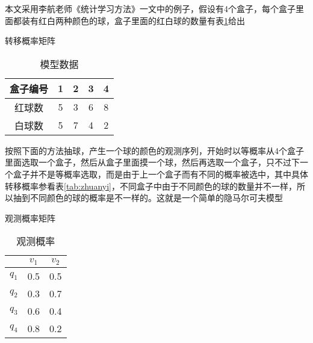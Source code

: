 \documentclass[a4paper,12pt]{ctexart}     %
\begin{document}
	
	本文采用李航老师《统计学习方法》一文中的例子，假设有4个盒子，每个盒子里面都装有红白两种颜色的球，盒子里面的红白球的数量有表\ref{tab:hezi}给出
	
	转移概率矩阵
	
	\begin{table}[htbp]\songti{} 
		\begin{center}
			\renewcommand\arraystretch{2}         %
			\caption{模型数据 \label{tab:hezi}} 
			{  %
				
				\begin{tabular}{|c|c|c|c|c|}\hline   %
					
					\small 盒子编号&1&2&3&4\\\hline   %
					红球数&5&3&6&8\\\hline
					白球数&5&7&4&2\\\hline
				\end{tabular}
			}
		\end{center}
	\end{table}
	
	按照下面的方法抽球，产生一个球的颜色的观测序列，开始时以等概率从4个盒子里面选取一个盒子，然后从盒子里面摸一个球，然后再选取一个盒子，只不过下一个盒子并不是等概率选取，而是由于上一个盒子而有不同的概率被选中，其中具体转移概率参看表\ref{tab:zhuanyi}，不同盒子中由于不同颜色的球的数量并不一样，所以抽到不同颜色的球的概率是不一样的。这就是一个简单的隐马尔可夫模型
	
	
	观测概率矩阵
	
	\begin{table}[htbp]\songti{} 
		
		\begin{center}
			\renewcommand\arraystretch{2}         %
			\caption{观测概率 \label{tab:shuoming}} 
			{
				
				\begin{tabular}{|c|c|c|}\hline   %
					
					\small &$ v_1 $&$ v_2$\\\hline   %
					$ q_1 $&0.5&0.5\\\hline
					$ q_2 $&0.3&0.7\\\hline
					$ q_3 $&0.6&0.4\\\hline
					$ q_4 $&0.8&0.2\\\hline
				\end{tabular}
			}
		\end{center}
	\end{table}
	
\end{document}
